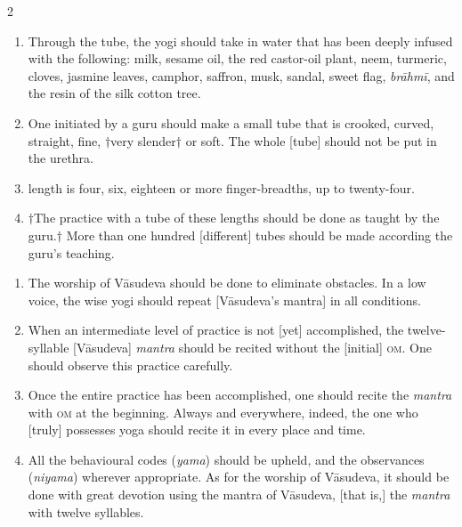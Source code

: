 \begin{nohyp}
\begin{multicols}{2}
\begin{eng}

\begin{enumerate}[nosep]
\item[25–26.] Through the tube, the yogi should take in water that has been deeply infused with the following: milk, sesame oil, the red castor-oil plant, neem, turmeric, cloves, jasmine leaves, camphor, saffron, musk, sandal, sweet flag, \textit{brāhmī}, and the resin of the silk cotton tree.
\item[27.] One initiated by a guru should make a small tube that is crooked, curved, straight, fine, $\dagger$very slender$\dagger$ or soft. The whole [tube] should not be put in the urethra.
\item[28.] [The tube’s] length is four, six, eighteen or more finger-breadths, up to twenty-four.
\item[29.] $\dagger$The practice with a tube of these lengths should be done as taught by the guru.$\dagger$ More than one hundred [different] tubes should be made according the guru’s teaching. 
\end{enumerate}
\vskip 7pt


\begin{enumerate}[nosep]
\item[30.] The worship of Vāsudeva should be done to eliminate obstacles. In a low voice, the wise yogi should repeat [Vāsudeva’s mantra] in all conditions.
\item[31.] When an intermediate level of practice is not [yet] accomplished, the twelve-syllable [Vāsudeva] \emph{mantra} should be recited without the [initial] \textsc{om}. One should observe this practice carefully.
\item[32.] Once the entire practice has been accomplished, one should recite the \emph{mantra} with \textsc{om} at the beginning. Always and everywhere, indeed, the one who [truly] possesses yoga should recite it in every place and time.
\item[33.] All the behavioural codes (\textit{yama}) should be upheld, and the observances (\textit{niyama}) wherever appropriate. As for the worship of Vāsudeva, it should be done with great devotion using the mantra of Vāsudeva, [that is,] the \emph{mantra} with twelve syllables.
\end{enumerate}
\vskip 7pt


\end{eng}
\end{multicols}
\end{nohyp}
